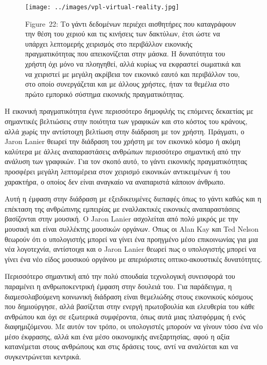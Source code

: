 \documentclass[
]{article}
\begin{document}
\leavevmode{}%
\begin{figure}
\hypertarget{fig:vpl-virtual-reality}{%
\centering
\texttt{[image: ../images/vpl-virtual-reality.jpg]}
\caption{Figure~22: Το γάντι δεδομένων περιέχει αισθητήρες που
καταγράφουν την θέση του χεριού και τις κινήσεις των δακτύλων, έτσι ώστε
να υπάρχει λεπτομερής χειρισμός στο περιβάλλον εικονικής πραγματικότητας
που απεικονίζεται στην μάσκα. Η δυνατότητα του χρήστη όχι μόνο να
πλοηγηθεί, αλλά κυρίως να εκφραστεί σωματικά και να χειριστεί με μεγάλη
ακρίβεια τον εικονικό εαυτό και περιβάλλον του, στο οποίο συνεργάζεται
και με άλλους χρήστες, ήταν τα θεμέλια στο πρώτο εμπορικό σύστημα
εικονικής πραγματικότητας.}\label{fig:vpl-virtual-reality}
}
\end{figure}

Η εικονική πραγματικότητα έγινε περισσότερο δημοφιλής τις επόμενες
δεκαετίας με σημαντικές βελτιώσεις στην ποιότητα των γραφικών και στο
κόστος του κράνους, αλλά χωρίς την αντίστοιχη βελτίωση στην διάδραση με
τον χρήστη. Πράγματι, ο Jaron Lanier θεωρεί την διάδραση του χρήστη με
τον εικονικό κόσμο ή ακόμη καλύτερα με άλλες αναπαραστάσεις ανθρώπων
περισσότερο σημαντική από την ανάλυση των γραφικών. Για τον σκοπό αυτό,
το γάντι εικονικής πραγματικότητας προσφέρει μεγάλη λεπτομέρεια στον
χειρισμό εικονικών αντικειμένων ή του χαρακτήρα, ο οποίος δεν είναι
αναγκαίο να αναπαριστά κάποιον άνθρωπο.

Αυτή η έμφαση στην διάδραση με εξειδικευμένες διεπαφές όπως το γάντι
καθώς και η επέκταση της ανθρώπινης εμπειρίας με εναλλακτικές εικονικές
αναπαραστάσεις βασίζονται στην μουσική. O Jaron Lanier ασχολείται από
πολύ μικρός με την μουσική και είναι συλλέκτης μουσικών οργάνων. Όπως οι
Alan Kay και Ted Nelson θεωρούν ότι ο υπολογιστής μπορεί να γίνει ένα
προηγμένο μέσο επικοινωνίας για μια νέα λογοτεχνία, αντίστοιχα και ο
Jaron Lanier θεωρεί πως ο υπολογιστής μπορεί να γίνει ένα νέο είδος
μουσικού οργάνου με απεριόριστες οπτικο-ακουστικές δυνατότητες.

Περισσότερο σημαντική από την πολύ σπουδαία τεχνολογική συνεισφορά του
παραμένει η ανθρωποκεντρική έμφαση στην δουλειά του. Για παράδειγμα, η
διαμεσολαβούμενη κοινωνική διάδραση είναι θεμελιώδης στους εικονικούς
κόσμους που δημιούργησε, αλλά βασίζεται στην ενεργή πρωτοβουλία και
ελευθερία του κάθε ανθρώπου και όχι σε εξωτερικά συμφέροντα, όπως αυτά
μιας πλατφόρμας ή ενός διαφημιζόμενου. Με αυτόν τον τρόπο, οι
υπολογιστές μπορούν να γίνουν τόσο ένα νέο μέσο έκφρασης, αλλά και ένα
μέσο οικονομικής ανεξαρτησίας, αφού η αξία κατανέμεται στους ανθρώπους
και στις δράσεις τους, αντί να αναλύεται και να συγκεντρώνεται κεντρικά.
\end{document}
